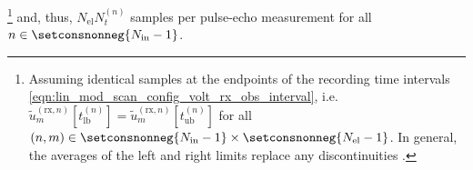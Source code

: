 \footnote{%
 Assuming identical samples at
 the endpoints of
 the recording time intervals
 \eqref{eqn:lin_mod_scan_config_volt_rx_obs_interval}, i.e.
 $\tilde{u}_{m}^{(\text{rx}, n)}[ t_{\text{lb}}^{(n)} ] = \tilde{u}_{m}^{(\text{rx}, n)}[ t_{\text{ub}}^{(n)} ]$ for
 all $( n, m ) \in \setconsnonneg{ N_{\text{in}} - 1 } \times \setconsnonneg{ N_{\text{el}} - 1 }$.
 In general,
 the averages of
 the left and right limits replace
 any discontinuities
 \cite[40]{book:Briggs1995}.
} and, thus,
$N_{\text{el}} N_{t}^{(n)}$ samples per
pulse-echo measurement for
all $n \in \setconsnonneg{ N_{\text{in}} - 1 }$.
